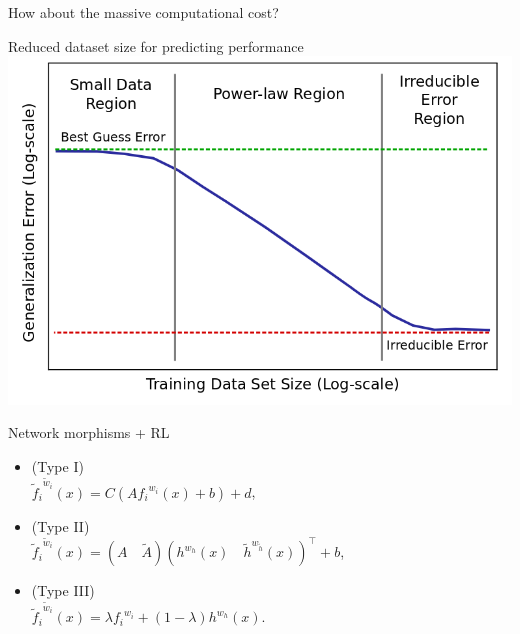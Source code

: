 \documentclass{beamer}
\begin{document}
\begin{frame}[standout]
        How about the massive computational cost?
\end{frame}

{%
\begin{frame}{Reduced dataset size for predicting performance}
\centering
\hspace*{-6mm}
\includegraphics[width=1.1\textwidth]{data/dl-scaling-predictable}
\end{frame}
}

\newcommand{\tildef}{\tilde{f}_i}
\newcommand{\tildew}{\tilde{w}_i}
\newcommand{\tildefw}{{\tildef}^{\tildew}}
\newcommand{\fw}{{f_i}^{w_i}}
{%
\begin{frame}[fragile]{Network morphisms + RL}
\centering
\begin{itemize}[<+- | alert@+>]
\item (Type I) \\
        $\tildefw(x) = C(A{f_i}^{w_i}(x) + b) + d$,

\vspace*{5mm}

\item (Type II) \\
$\tildefw(x) = (A \quad\tilde{A}){(h^{w_h}(x) \quad{\tilde{h}}^{w_{\tilde{h}}}(x))}^\intercal + b$,

\vspace*{5mm}

\item (Type III) \\
        $\tildefw(x) = \lambda \fw + (1 - \lambda) h^{w_h}(x)$.
\end{itemize}
\end{frame}
}
\end{document}
